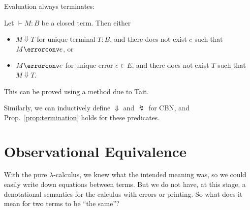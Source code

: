 \documentclass[runningheads,12pt]{llncs}
\begin{document}


Evaluation always terminates:
\begin{proposition} \label{prop:termination}
  Let $\vdash M : B$ be a closed term.  Then either
  \begin{itemize}
  \item $M \Downarrow T$ for unique terminal $T : B$, and there does not exist $e$ such that $M \errorconv e$, or
 \item $M \errorconv e$ for unique error $e \in E$, and there does not exist $T$ such that $M \Downarrow T$.
  \end{itemize}
\end{proposition}
This can be proved using a method due to Tait.

Similarly, we can inductively define $\Downarrow$ and $\lightning$ for CBN, and Prop.~\ref{prop:termination} holds for these predicates.

\section{Observational Equivalence}

With the pure $\lambda$-calculus, we knew what the intended meaning was, so we could easily write down equations between terms.  But we do not have, at this stage, a denotational semantics for the calculus with errors or printing.  So what does it mean for two terms to be ``the same''?
\end{document}
